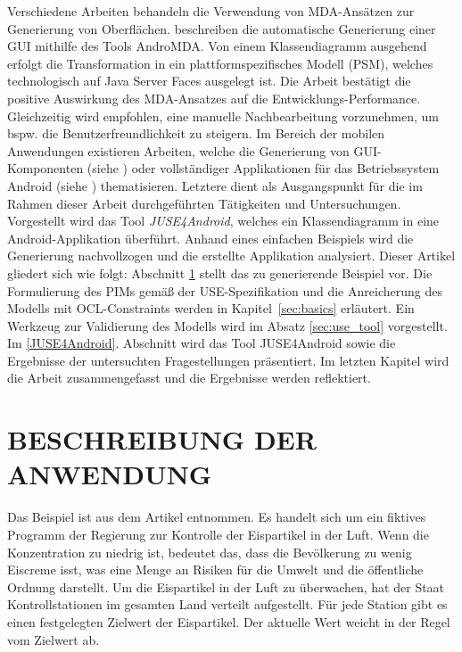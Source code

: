\documentclass[a4paper,twoside]{article}
\begin{document}
Verschiedene Arbeiten behandeln die Verwendung von MDA-Ansätzen zur Generierung von Oberflächen. \cite{GUI_MDA} beschreiben die automatische Generierung einer GUI mithilfe des Tools AndroMDA. Von einem Klassendiagramm ausgehend erfolgt die Transformation in ein plattformspezifisches Modell (PSM), welches technologisch auf Java Server Faces ausgelegt ist. Die Arbeit bestätigt die positive Auswirkung des MDA-Ansatzes auf die Entwicklungs-Performance. Gleichzeitig wird empfohlen, eine manuelle Nachbearbeitung vorzunehmen, um bspw. die Benutzerfreundlichkeit zu steigern.
Im Bereich der mobilen Anwendungen existieren Arbeiten, welche die Generierung von GUI-Komponenten (siehe \cite{GUI_MDA_Android}) oder vollständiger Applikationen für das Betriebssystem Android (siehe \cite{JUSE}) thematisieren. Letztere dient als Ausgangspunkt für die im Rahmen dieser Arbeit durchgeführten Tätigkeiten und Untersuchungen. Vorgestellt wird das Tool \textit{JUSE4Android}, welches ein Klassendiagramm in eine Android-Applikation überführt. Anhand eines einfachen Beispiels wird die Generierung nachvollzogen und die erstellte Applikation analysiert. Dieser Artikel gliedert sich wie folgt: Abschnitt \ref{sec:iceCream} stellt das zu generierende Beispiel vor. Die Formulierung des PIMs gemäß der    
USE-Spezifikation und die Anreicherung des Modells mit OCL-Constraints werden in Kapitel~\ref{sec:basics} erläutert. Ein Werkzeug zur Validierung des Modells wird im  Absatz \ref{sec:use_tool} vorgestellt. Im \ref{JUSE4Android}. Abschnitt wird das Tool JUSE4Android sowie die Ergebnisse der untersuchten Fragestellungen präsentiert. Im letzten Kapitel wird die Arbeit zusammengefasst und die Ergebnisse werden reflektiert.

\section{\uppercase{Beschreibung der Anwendung}}
\label{sec:iceCream}
\noindent
Das Beispiel ist aus dem Artikel \cite{Gui06} entnommen. Es handelt sich um ein fiktives Programm der Regierung zur Kontrolle der Eispartikel in der Luft. Wenn die Konzentration zu niedrig ist, bedeutet das, dass die Bevölkerung zu wenig Eiscreme isst, was eine Menge an Risiken für die Umwelt und die öffentliche Ordnung darstellt. Um die Eispartikel in der Luft zu überwachen, hat der Staat Kontrollstationen im gesamten Land verteilt aufgestellt. Für jede Station gibt es einen festgelegten Zielwert der Eispartikel. Der aktuelle Wert weicht in der Regel vom Zielwert ab. 
\\
\end{document}
